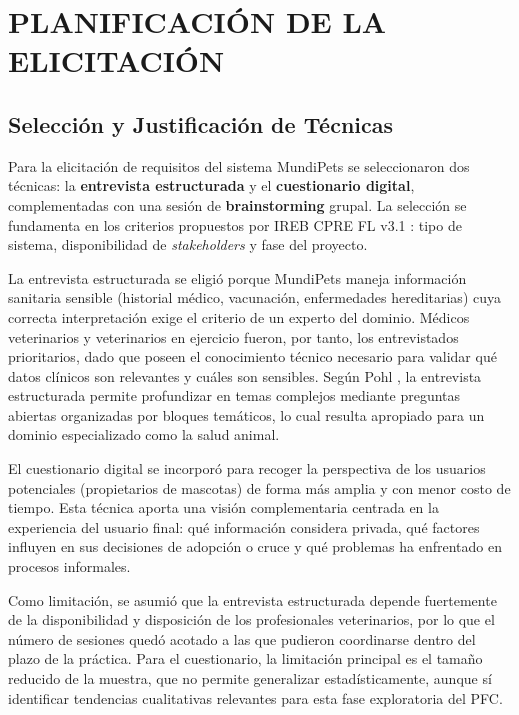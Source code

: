 \section{PLANIFICACIÓN DE LA ELICITACIÓN}

\subsection{Selección y Justificación de Técnicas}

Para la elicitación de requisitos del sistema MundiPets se seleccionaron dos técnicas: la \textbf{entrevista estructurada} y el \textbf{cuestionario digital}, complementadas con una sesión de \textbf{brainstorming} grupal. La selección se fundamenta en los criterios propuestos por IREB CPRE FL v3.1 \cite{ireb2024}: tipo de sistema, disponibilidad de \textit{stakeholders} y fase del proyecto.

La entrevista estructurada se eligió porque MundiPets maneja información sanitaria sensible (historial médico, vacunación, enfermedades hereditarias) cuya correcta interpretación exige el criterio de un experto del dominio. Médicos veterinarios y veterinarios en ejercicio fueron, por tanto, los entrevistados prioritarios, dado que poseen el conocimiento técnico necesario para validar qué datos clínicos son relevantes y cuáles son sensibles. Según Pohl \cite{pohl2025}, la entrevista estructurada permite profundizar en temas complejos mediante preguntas abiertas organizadas por bloques temáticos, lo cual resulta apropiado para un dominio especializado como la salud animal.

El cuestionario digital se incorporó para recoger la perspectiva de los usuarios potenciales (propietarios de mascotas) de forma más amplia y con menor costo de tiempo. Esta técnica aporta una visión complementaria centrada en la experiencia del usuario final: qué información considera privada, qué factores influyen en sus decisiones de adopción o cruce y qué problemas ha enfrentado en procesos informales.

Como limitación, se asumió que la entrevista estructurada depende fuertemente de la disponibilidad y disposición de los profesionales veterinarios, por lo que el número de sesiones quedó acotado a las que pudieron coordinarse dentro del plazo de la práctica. Para el cuestionario, la limitación principal es el tamaño reducido de la muestra, que no permite generalizar estadísticamente, aunque sí identificar tendencias cualitativas relevantes para esta fase exploratoria del PFC.

